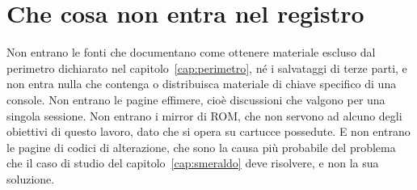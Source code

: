 \section{Che cosa non entra nel registro}

Non entrano le fonti che documentano come ottenere materiale escluso dal perimetro dichiarato nel capitolo~\ref{cap:perimetro}, né i salvataggi di terze parti, e non entra nulla che contenga o distribuisca materiale di chiave specifico di una console. Non entrano le pagine effimere, cioè discussioni che valgono per una singola sessione. Non entrano i mirror di ROM, che non servono ad alcuno degli obiettivi di questo lavoro, dato che si opera su cartucce possedute. E non entrano le pagine di codici di alterazione, che sono la causa più probabile del problema che il caso di studio del capitolo~\ref{cap:smeraldo} deve risolvere, e non la sua soluzione.
